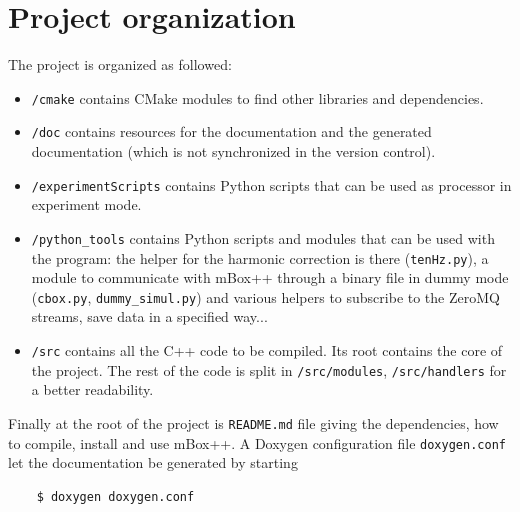 \section{Project organization}
The project is organized as followed:
\begin{itemize}
    \item \texttt{/cmake} contains CMake modules to find other libraries and dependencies.
    \item \texttt{/doc} contains resources for the documentation and the generated documentation (which is not synchronized in the version control).
    \item \texttt{/experimentScripts} contains Python scripts that can be used as processor in experiment mode.
    \item \texttt{/python\_tools} contains Python scripts and modules that can be used with the program: the helper for the harmonic correction is there (\texttt{tenHz.py}), a module to communicate with mBox++ through a binary file in dummy mode (\texttt{cbox.py}, \texttt{dummy\_simul.py}) and various helpers to subscribe to the ZeroMQ streams, save data in a specified way...
    \item \texttt{/src} contains all the C++ code to be compiled. Its root contains the core of the project. The rest of the code is split in \texttt{/src/modules}, \texttt{/src/handlers} for a better readability.     
    \end{itemize}
Finally at the root of the project is \texttt{README.md} file giving the dependencies, how to compile, install and use mBox++. A Doxygen configuration file \texttt{doxygen.conf} let the documentation be generated by starting
\begin{verbatim}
    $ doxygen doxygen.conf
\end{verbatim}
   
